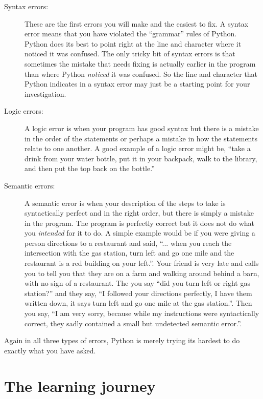 \documentclass[11pt]{book}
\begin{document}
\begin{description}

\item[Syntax errors:] These are the first errors you will make and the easiest
to fix.  A syntax error means that you have violated the ``grammar'' rules of Python.
Python does its best to point right at the line and character where 
it noticed it was confused.  The only tricky bit of syntax errors is that sometimes
the mistake that needs fixing is actually earlier in the program than where Python
{\em noticed} it was confused.  So the line and character that Python indicates in 
a syntax error may just be a starting point for your investigation.

\item[Logic errors:] A logic error is when your program has good syntax but there is a mistake 
in the order of the statements or perhaps a mistake in how the statements relate to one another.
A good example of a logic error might be, ``take a drink from your water bottle, put it 
in your backpack, walk to the library, and then put the top back on the bottle.''

\item[Semantic errors:] A semantic error is when your description of the steps to take 
is syntactically perfect and in the right order, but there is simply a mistake in 
the program.  The program is perfectly correct but it does not do what
you {\em intended} for it to do. A simple example would
be if you were giving a person directions to a restaurant and said, ``... when you reach
the intersection with the gas station, turn left and go one mile and the restaurant
is a red building on your left.''.  Your friend is very late and calls you to tell you that
they are on a farm and walking around behind a barn, with no sign of a restaurant.  
The you say ``did you turn left or right gas station?'' and 
they say, ``I followed your directions perfectly, I have 
them written down, it says turn left and go one mile at the gas station.''.  Then you say,
``I am very sorry, because while my instructions were syntactically correct, they 
sadly contained a small but undetected semantic error.''. 

\end{description}

Again in all three types of errors, Python is merely trying its hardest to 
do exactly what you have asked.

\section{The learning journey}
\end{document}
